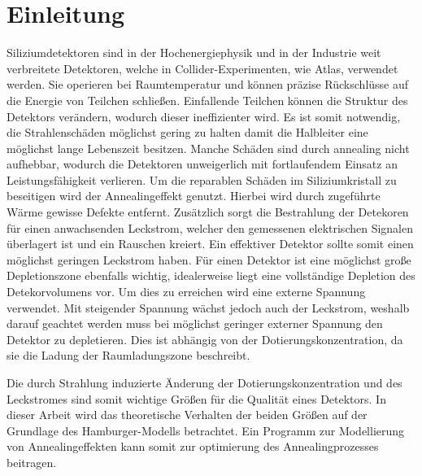 \chapter{Einleitung}
Siliziumdetektoren sind in der Hochenergiephysik und in der Industrie weit verbreitete
Detektoren, welche in Collider-Experimenten, wie Atlas, verwendet werden.
Sie operieren bei Raumtemperatur und können präzise Rückschlüsse auf die
Energie von Teilchen schließen. Einfallende Teilchen können die
Struktur des Detektors verändern, wodurch dieser ineffizienter wird.
Es ist somit notwendig, die Strahlenschäden möglichst gering zu halten damit
die Halbleiter eine möglichst lange Lebenszeit besitzen. Manche Schäden sind durch annealing nicht
aufhebbar, wodurch die Detektoren unweigerlich mit fortlaufendem Einsatz
an Leistungsfähigkeit verlieren. Um die reparablen Schäden im Siliziumkristall
zu beseitigen wird der Annealingeffekt genutzt. Hierbei wird durch zugeführte Wärme gewisse
Defekte entfernt.
Zusätzlich sorgt die Bestrahlung der Detekoren für einen anwachsenden Leckstrom, welcher den
gemessenen elektrischen Signalen überlagert ist und ein Rauschen kreiert. Ein
effektiver Detektor sollte somit einen möglichst geringen Leckstrom haben.
Für einen Detektor ist eine möglichst große Depletionszone ebenfalls wichtig, idealerweise
liegt eine vollständige Depletion des Detekorvolumens vor. Um dies zu erreichen wird
eine externe Spannung verwendet. Mit steigender Spannung wächst jedoch auch der Leckstrom, weshalb
darauf geachtet werden muss bei möglichst geringer externer Spannung den Detektor zu depletieren.
Dies ist abhängig von der Dotierungskonzentration, da sie die Ladung der
Raumladungszone beschreibt.

Die durch Strahlung induzierte Änderung der Dotierungskonzentration und des Leckstromes sind
somit wichtige Größen für die Qualität eines Detektors. In dieser Arbeit wird das
theoretische Verhalten der beiden Größen auf der Grundlage des Hamburger-Modells betrachtet.
Ein Programm zur Modellierung von Annealingeffekten kann somit zur
optimierung des Annealingprozesses beitragen.


